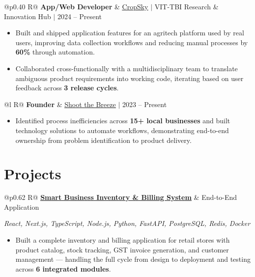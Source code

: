 \documentclass[a4paper,10pt]{article}
\newcommand{\ulink}[2]{\href{#1}{\uline{#2}}}
\newcommand{\subheading}[1]{{\color[HTML]{0A0A0A}\fontsize{12}{14}\selectfont\bfseries #1}}
\newcommand{\techstack}[1]{{\color[HTML]{5C5C5C}\fontsize{10.5}{12.5}\selectfont\itshape #1}}
\newcommand{\meta}[1]{{\color[HTML]{5C5C5C}\fontsize{10.5}{12.5}\selectfont #1}}
\begin{document}
\begin{tabularx}{\linewidth}{@{}p{0.40\linewidth} R@{}}
\subheading{App/Web Developer} & \meta{\ulink{https://sites.google.com/view/cropsky/home}{CropSky} $|$ VIT-TBI Research \& Innovation Hub $|$ 2024 -- Present}
\end{tabularx}
\begin{itemize}[nosep, leftmargin=1.5em, itemsep=1pt, topsep=2pt]
  \item {\color[HTML]{0A0A0A}\fontsize{11}{14}\selectfont Built and shipped application features for an agritech platform used by real users, improving data collection workflows and reducing manual processes by \textbf{60\%} through automation.}
  \item {\color[HTML]{0A0A0A}\fontsize{11}{14}\selectfont Collaborated cross-functionally with a multidisciplinary team to translate ambiguous product requirements into working code, iterating based on user feedback across \textbf{3 release cycles}.}
\end{itemize}

\vspace{2pt}

\begin{tabularx}{\linewidth}{@{}l R@{}}
\subheading{Founder} & \meta{\ulink{https://shoot-the-breeze.vercel.app}{Shoot the Breeze} $|$ 2023 -- Present}
\end{tabularx}
\begin{itemize}[nosep, leftmargin=1.5em, itemsep=1pt, topsep=2pt]
  \item {\color[HTML]{0A0A0A}\fontsize{11}{14}\selectfont Identified process inefficiencies across \textbf{15+ local businesses} and built technology solutions to automate workflows, demonstrating end-to-end ownership from problem identification to product delivery.}
\end{itemize}

\vspace{2pt}

\section{Projects}
\vspace{2pt}

\begin{tabularx}{\linewidth}{@{}p{0.62\linewidth} R@{}}
\subheading{\ulink{https://github.com/su-jin1425/Smart-Local-Business-Inventory-Billing-System}{Smart Business Inventory \& Billing System}} & \meta{End-to-End Application}
\end{tabularx}
\vspace{1pt}
\techstack{React, Next.js, TypeScript, Node.js, Python, FastAPI, PostgreSQL, Redis, Docker}
\begin{itemize}[nosep, leftmargin=1.5em, itemsep=1pt, topsep=2pt]
  \item {\color[HTML]{0A0A0A}\fontsize{11}{14}\selectfont Built a complete inventory and billing application for retail stores with product catalog, stock tracking, GST invoice generation, and customer management --- handling the full cycle from design to deployment and testing across \textbf{6 integrated modules}.}
\end{itemize}
\end{document}
